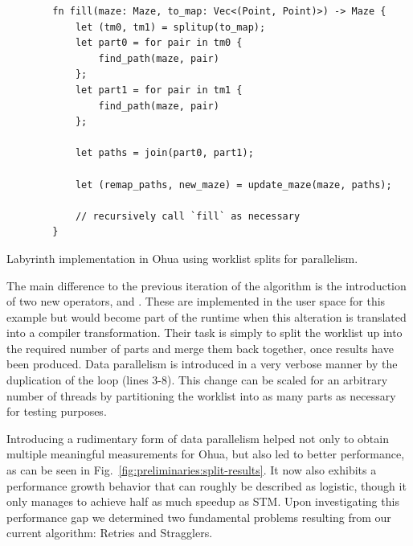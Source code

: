 \begin{listing}[b]
    \begin{verbatim}
        fn fill(maze: Maze, to_map: Vec<(Point, Point)>) -> Maze {
            let (tm0, tm1) = splitup(to_map);
            let part0 = for pair in tm0 {
                find_path(maze, pair)
            };
            let part1 = for pair in tm1 {
                find_path(maze, pair)
            };

            let paths = join(part0, part1);

            let (remap_paths, new_maze) = update_maze(maze, paths);

            // recursively call `fill` as necessary
        }
    \end{verbatim}
    \caption{Labyrinth implementation in Ohua using worklist splits for parallelism.}%
    \label{fig:preliminaries:ohua2}
\end{listing}

The main difference to the previous iteration of the algorithm is the introduction of two new operators,  and .
These are implemented in the user space for this example but would become part of the runtime when this alteration is translated into a compiler transformation.
Their task is simply to split the worklist up into the required number of parts and merge them back together, once results have been produced.
Data parallelism is introduced in a very verbose manner by the duplication of the loop (lines 3-8).
This change can be scaled for an arbitrary number of threads by partitioning the worklist into as many parts as necessary for testing purposes.

Introducing a rudimentary form of data parallelism helped not only to obtain multiple meaningful measurements for Ohua, but also led to better performance, as can be seen in Fig.~\ref{fig:preliminaries:split-results}.
It now also exhibits a performance growth behavior that can roughly be described as logistic, though it only manages to achieve half as much speedup as STM.
Upon investigating this performance gap we determined two fundamental problems resulting from our current algorithm: Retries and Stragglers.

